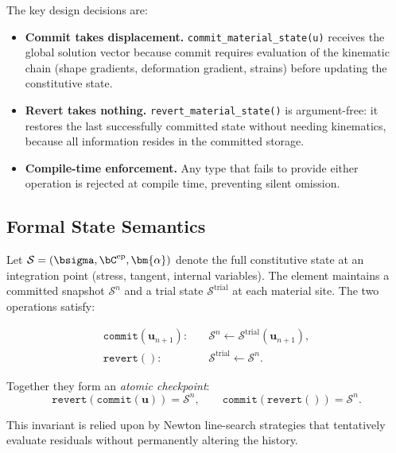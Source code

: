 The key design decisions are:

\begin{itemize}
  \item \textbf{Commit takes displacement.}
        \texttt{commit\_material\_state(u)} receives the global solution
        vector because commit requires evaluation of the kinematic chain
        (shape gradients, deformation gradient, strains) before updating
        the constitutive state.
  \item \textbf{Revert takes nothing.}
        \texttt{revert\_material\_state()} is argument-free: it restores
        the last successfully committed state without needing kinematics,
        because all information resides in the committed storage.
  \item \textbf{Compile-time enforcement.}
        Any type that fails to provide either operation is rejected at
        compile time, preventing silent omission.
\end{itemize}

\subsection{Formal State Semantics}
\label{sec:commit-revert-semantics}

Let $\mathcal{S} = (\bsigma, \bC^{\text{ep}}, \bm{\alpha})$ denote
the full constitutive state at an integration point (stress, tangent,
internal variables).  The element maintains a committed snapshot
$\mathcal{S}^n$ and a trial state $\mathcal{S}^{\text{trial}}$ at each
material site.  The two operations satisfy:

\begin{align}
  \texttt{commit}(\mathbf{u}_{n+1}):
  \quad & \mathcal{S}^n \leftarrow
          \mathcal{S}^{\text{trial}}(\mathbf{u}_{n+1}),
  \label{eq:commit-op} \\[4pt]
  \texttt{revert}():
  \quad & \mathcal{S}^{\text{trial}} \leftarrow \mathcal{S}^n.
  \label{eq:revert-op}
\end{align}

Together they form an \emph{atomic checkpoint}:
\[
  \texttt{revert}(\texttt{commit}(\mathbf{u})) = \mathcal{S}^n,
  \qquad
  \texttt{commit}(\texttt{revert}()) = \mathcal{S}^n.
\]

This invariant is relied upon by Newton line-search strategies that
tentatively evaluate residuals without permanently altering the
history.

